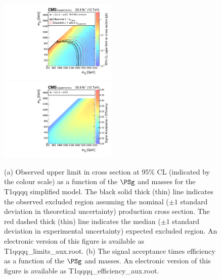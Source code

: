 \clearpage
\begin{figure}
    \begin{center}
            \includegraphics[width=0.50\textwidth]{Supplementary/T1qqqqXSEC}
            \includegraphics[width=0.50\textwidth]{Supplementary/T1qqqq_efficiency_aux}
        \caption{ (a) Observed upper limit in cross section at 95\% CL (indicated
        by the colour scale) as a function of 
        the $\PSg$ and \PSGczDo %
        masses for the 
        T1qqqq %
        simplified  model.  The  black  solid thick  (thin)  line indicates  the
        observed  excluded  region  assuming   the  nominal  (${\pm}1$  standard
        deviation in theoretical uncertainty)  production cross section. The red
        dashed  thick  (thin)  line  indicates  the  median  (${\pm}1$  standard
        deviation in experimental uncertainty) expected excluded region.
    An electronic version of this figure is available as T1qqqq\_limits\_aux.root.
        (b) The signal acceptance times efficiency as a function of 
        the $\PSg$ and \PSGczDo %
        masses.
    An electronic version of this figure is available as T1qqqq\_efficiency\_aux.root.
        }
        \label{fig:T1qqqq}
    \end{center}
\end{figure}

